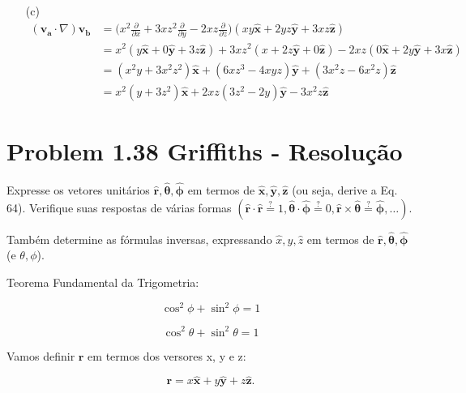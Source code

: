 \documentclass[a4paper,12pt]{article}
\begin{document}
\begin{enumerate}
    \item[(c)]
    \begin{align}
        (\mathbf{v_a} \cdot \nabla) \mathbf{v_b} &= \Big(x^2 \frac{\partial}{\partial x} + 3x z^2 \frac{\partial}{\partial y} - 2xz \frac{\partial}{\partial z}\Big) (xy \hat{\mathbf{x}} + 2yz \hat{\mathbf{y}} + 3xz \hat{\mathbf{z}})\\
        &= x^2 (y \hat{\mathbf{x}} + 0 \hat{\mathbf{y}} + 3z \hat{\mathbf{z}}) + 3x z^2 (x + 2z \hat{\mathbf{y}} + 0 \hat{\mathbf{z}}) - 2xz (0 \hat{\mathbf{x}} + 2y \hat{\mathbf{y}} + 3x \hat{\mathbf{z}})\\
        &= (x^2 y + 3x^2 z^2) \hat{\mathbf{x}} + (6xz^3 - 4xyz) \hat{\mathbf{y}} + (3x^2 z - 6x^2 z) \hat{\mathbf{z}}\\
        &= \boxed{x^2 (y + 3z^2)\hat{\mathbf{x}} + 2xz (3z^2 - 2y) \hat{\mathbf{y}} - 3x^2 z \hat{\mathbf{z}}}
        \end{align}

\end{enumerate}


\section*{Problem 1.38 Griffiths - Resolu\c{c}\~ao}

Expresse os vetores unitários \( \hat{\mathbf{r}}, \hat{\bm{\theta}}, \hat{\bm{\phi}} \) em termos de \( \hat{\mathbf{x}}, \hat{\mathbf{y}}, \hat{\mathbf{z}} \) 
(ou seja, derive a Eq. 64). Verifique suas respostas de várias formas 
\(\left( \hat{\mathbf{r}} \cdot \hat{\mathbf{r}} \stackrel{?}{=} 1, \hat{\bm{\theta}} \cdot \hat{\bm{\phi}} \stackrel{?}{=} 0, \hat{\mathbf{r}} \times \hat{\bm{\theta}} \stackrel{?}{=} \hat{\bm{\phi}}, \dots \right)\).  

Também determine as fórmulas inversas, expressando \( \hat{x}, \hat{y}, \hat{z} \) em termos de \( \hat{\mathbf{r}}, \hat{\mathbf{\theta}}, \hat{\bm{\phi}} \) (e \( \theta, \phi \)).

Teorema Fundamental da Trigometria: 

$$\boxed{\cos^{2}\phi + \sin^{2}\phi = 1}$$

$$\boxed{\cos^{2}\theta + \sin^{2}\theta = 1}$$

Vamos definir $\mathbf{r}$ em termos dos versores x, y e z:

\begin{equation}
    \mathbf{r} = x \hat{\mathbf{x}} + y \hat{\mathbf{y}} + z \hat{\mathbf{z}}.
\end{equation}
\end{document}
